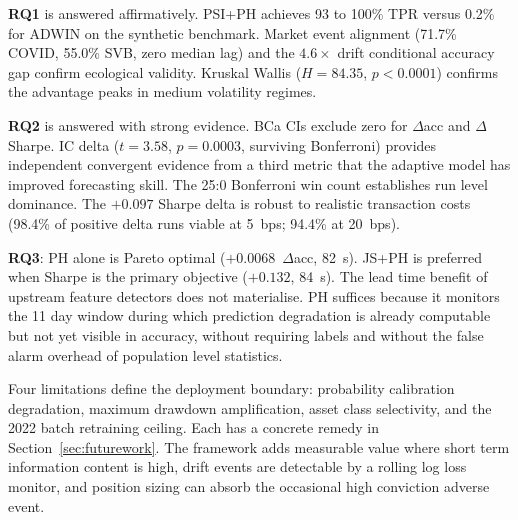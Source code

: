 \textbf{RQ1} is answered affirmatively. PSI+PH achieves 93 to 100\% TPR versus 0.2\% for ADWIN on the synthetic benchmark. Market event alignment (71.7\% COVID, 55.0\% SVB, zero median lag) and the $4.6\times$ drift conditional accuracy gap confirm ecological validity. Kruskal Wallis ($H{=}84.35$, $p{<}0.0001$) confirms the advantage peaks in medium volatility regimes.

\textbf{RQ2} is answered with strong evidence. BCa CIs exclude zero for $\Delta$acc and $\Delta$Sharpe. IC delta ($t{=}3.58$, $p{=}0.0003$, surviving Bonferroni) provides independent convergent evidence from a third metric that the adaptive model has improved forecasting skill. The 25:0 Bonferroni win count establishes run level dominance. The $+0.097$ Sharpe delta is robust to realistic transaction costs (98.4\% of positive delta runs viable at 5~bps; 94.4\% at 20~bps).

\textbf{RQ3}: PH alone is Pareto optimal ($+0.0068$~$\Delta$acc, 82~s). JS+PH is preferred when Sharpe is the primary objective ($+0.132$, 84~s). The lead time benefit of upstream feature detectors does not materialise. PH suffices because it monitors the 11 day window during which prediction degradation is already computable but not yet visible in accuracy, without requiring labels and without the false alarm overhead of population level statistics.

Four limitations define the deployment boundary: probability calibration degradation, maximum drawdown amplification, asset class selectivity, and the 2022 batch retraining ceiling. Each has a concrete remedy in Section~\ref{sec:futurework}. The framework adds measurable value where short term information content is high, drift events are detectable by a rolling log loss monitor, and position sizing can absorb the occasional high conviction adverse event.